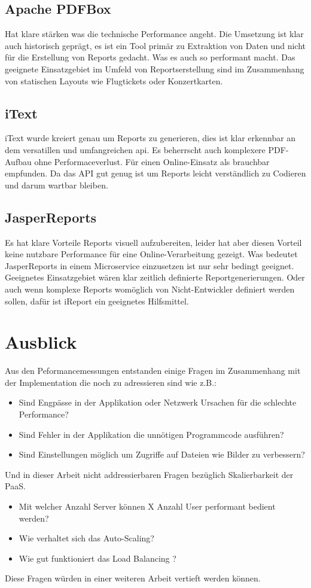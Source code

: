 \documentclass[main.tex]{subfiles}
\begin{document}
\subsection{Apache PDFBox}
Hat klare stärken was die technische Performance angeht. 
Die Umsetzung ist klar auch historisch geprägt, es ist ein Tool primär zu Extraktion von Daten und nicht für die Erstellung von Reports gedacht. Was es auch so performant macht. Das geeignete Einsatzgebiet im Umfeld von Reportserstellung sind im Zusammenhang von statischen Layouts wie Flugtickets oder Konzertkarten. 


\subsection{iText}
iText wurde kreiert genau um Reports zu generieren, dies ist klar erkennbar an dem versatillen und umfangreichen \acrlong{api}. Es beherrscht auch komplexere PDF-Aufbau ohne Performaceverlust. Für einen Online-Einsatz als brauchbar empfunden. Da das API gut genug ist um Reports leicht verständlich zu Codieren und darum wartbar bleiben.

\subsection{JasperReports}
Es hat klare Vorteile Reports visuell aufzubereiten, leider hat aber diesen Vorteil keine nutzbare Performance für eine Online-Verarbeitung gezeigt. Was bedeutet JasperReports in einem Microservice einzusetzen ist nur sehr bedingt geeignet. Geeignetes Einsatzgebiet wären klar zeitlich definierte Reportgenerierungen. Oder auch wenn komplexe Reports womöglich  von Nicht-Entwickler definiert werden sollen, dafür ist iReport ein geeignetes Hilfsmittel.  

\section{Ausblick}

Aus den Peformancemessungen entstanden einige Fragen im Zusammenhang mit der Implementation die noch zu adressieren sind wie z.B.: 
\begin{itemize}  
    \item Sind Engpässe in der Applikation oder Netzwerk Ursachen für die schlechte Performance? 
    \item Sind Fehler in der Applikation die unnötigen Programmcode ausführen?
    \item Sind Einstellungen möglich um Zugriffe auf Dateien wie Bilder zu verbessern?
\end{itemize}
Und in dieser Arbeit nicht addressierbaren Fragen bezüglich Skalierbarkeit der PaaS.
\begin{itemize}  
    \item Mit welcher Anzahl Server können X Anzahl User performant bedient werden?
    \item Wie verhaltet sich das Auto-Scaling?
    \item Wie gut funktioniert das Load Balancing ? 
\end{itemize}
Diese Fragen würden in einer weiteren Arbeit vertieft werden können. 
\end{document}

